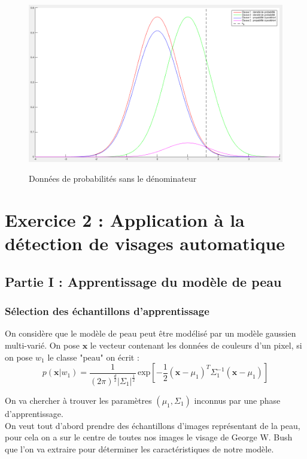 \documentclass[11pt,a4paper]{article}
\begin{document}
\begin{figure}[H]
\center
\includegraphics[width=15cm]{exo1_graph_numerateur.png}
\label{fig.exo1_graph_numerateur}
\caption{Données de probabilités sans le dénominateur}
\end{figure}

\section{Exercice 2 : Application à la détection de visages automatique}


\subsection{Partie I : Apprentissage du modèle de peau}

\subsubsection{Sélection des échantillons d'apprentissage}

On considère que le modèle de peau peut être modélisé par un modèle gaussien multi-varié. On pose $\textbf{x}$ le vecteur contenant les données de couleurs d'un pixel, si on pose $w_1$ le classe "peau" on écrit :
\begin{equation}
p(\textbf{x}|w_1) = \frac{1}{(2\pi)^{\frac{d}{2}}|\Sigma_1|^{\frac{1}{2}}}\,\text{exp}\left[-\frac{1}{2}(\textbf{x}-\mu_1)^T \Sigma_1^{-1}(\textbf{x}-\mu_1)\right]
\label{eq.gauss.multi}
\end{equation}

On va chercher à trouver les paramètres $\left(\mu_1,\Sigma_1\right)$ inconnus par une phase d'apprentissage.
\\
On veut tout d'abord prendre des échantillons d'images représentant de la peau, pour cela on a sur le centre de toutes nos images le visage de George W. Bush que l'on va extraire pour déterminer les caractéristiques de notre modèle.
\end{document}
